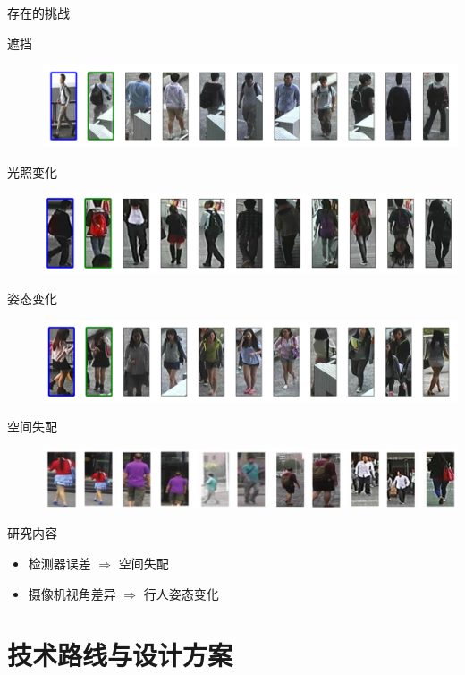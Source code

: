 \documentclass[usenames,dvipsnames,notes]{beamer}
\begin{document}
\begin{frame}
	{存在的挑战}
	\begin{description}
		\item[遮挡] \includegraphics[width=0.9\linewidth]{2018-03-12-10-09-03.png}
		\item[光照变化] \includegraphics[width=0.9\linewidth]{2018-03-12-10-10-10.png}
		\item[姿态变化] \includegraphics[width=0.9\linewidth]{2018-03-12-10-10-18.png}
		\item[空间失配] \includegraphics[width=0.88\linewidth]{2018-03-07-20-16-25.png}
	\end{description}

\end{frame}

\begin{frame}
	{研究内容}
	\begin{itemize}
		\item 检测器误差 $\Rightarrow$ 空间失配
		\item 摄像机视角差异 $\Rightarrow$ 行人姿态变化
	\end{itemize}
\end{frame}

\section{技术路线与设计方案}
\end{document}
